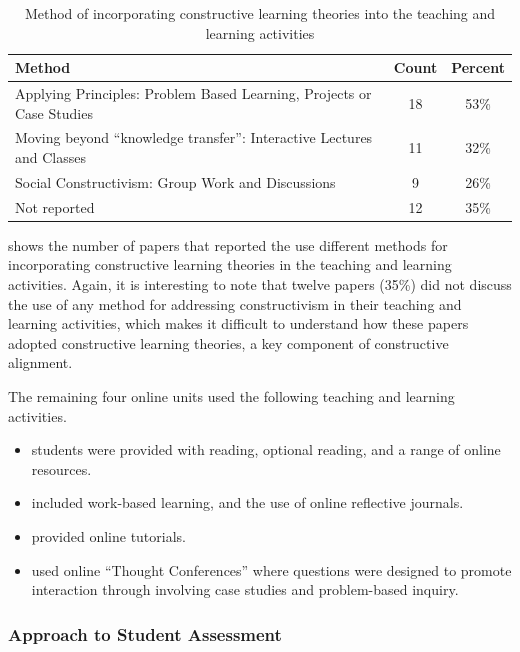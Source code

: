 \begin{table}[htpb]
	\centering
	\caption{Method of incorporating constructive learning theories into the teaching and learning activities}
	\label{tbl:class_constructive}
	\footnotesize
    \begin{tabular}{l|c|c}
    \textbf{Method} & \textbf{Count} & \textbf{Percent} \\ \hline
    Applying Principles: Problem Based Learning, Projects or Case Studies & 18 & 53\% \\
    Moving beyond ``knowledge transfer'': Interactive Lectures and Classes & 11 & 32\% \\
    Social Constructivism: Group Work and Discussions & 9 & 26\% \\
    Not reported & 12 & 35\% \\
    \end{tabular}
\end{table}

 shows the number of papers that reported the use different methods for incorporating constructive learning theories in the teaching and learning activities. Again, it is interesting to note that twelve papers (35\%) did not discuss the use of any method for addressing constructivism in their teaching and learning activities, which makes it difficult to understand how these papers adopted constructive learning theories, a key component of constructive alignment.

The remaining four online units used the following teaching and learning activities.

\begin{itemize}[noitemsep,nolistsep]
	\item \citet{hoddinott2000biggs} students were provided with reading, optional reading, and a range of online resources.
	\item \citet{raeburn2009blended} included work-based learning, and the use of online reflective journals.
	\item \citet{terrell2011using} provided online tutorials.
	\item \citet{brown2006looking} used online ``Thought Conferences'' where questions were designed to promote interaction through involving case studies and problem-based inquiry.
\end{itemize}

\subsubsection{Approach to Student Assessment} %
\label{sub:review_assessment_approach}

